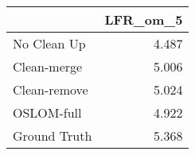 \begin{tabular}{lr}
\toprule
{} & LFR_om_5 \\
\midrule
No Clean Up  &    4.487 \\
Clean-merge  &    5.006 \\
Clean-remove &    5.024 \\
OSLOM-full   &    4.922 \\
Ground Truth &    5.368 \\
\bottomrule
\end{tabular}
